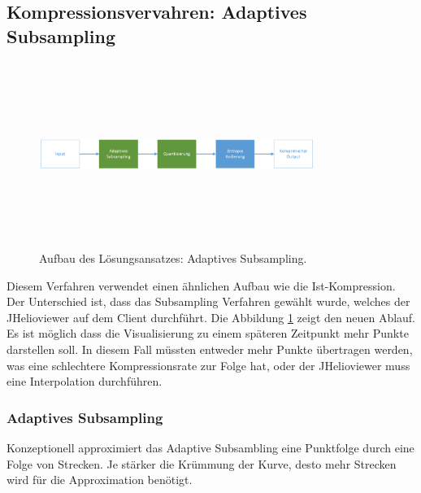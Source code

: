 \subsection{Kompressionsvervahren: Adaptives Subsampling} \label{konzept:loesung0}
\begin{figure}[!htbp]
	\center
	\includegraphics[width=0.8\textwidth,height=6cm,keepaspectratio]{./pictures/konzept/solution0/aufbau.png}
	\caption{Aufbau des Lösungsansatzes: Adaptives Subsampling.}
	\label{konzept:loesung0:aufbau:diagramm}
\end{figure} 
Diesem Verfahren verwendet einen ähnlichen Aufbau wie die Ist-Kompression. Der Unterschied ist, dass das Subsampling Verfahren gewählt wurde, welches der JHelioviewer auf dem Client durchführt. Die Abbildung \ref{konzept:loesung0:aufbau:diagramm} zeigt den neuen Ablauf.\\
Es ist möglich dass die Visualisierung zu einem späteren Zeitpunkt mehr Punkte darstellen soll. In diesem Fall müssten entweder mehr Punkte übertragen werden, was eine schlechtere Kompressionsrate zur Folge hat, oder der JHelioviewer muss eine Interpolation durchführen. 

\subsubsection{Adaptives Subsampling}\label{konzept:loesung0:subsampling}
Konzeptionell approximiert das Adaptive Subsambling eine Punktfolge durch eine Folge von Strecken. Je stärker die Krümmung der Kurve, desto mehr Strecken wird für die Approximation benötigt.

